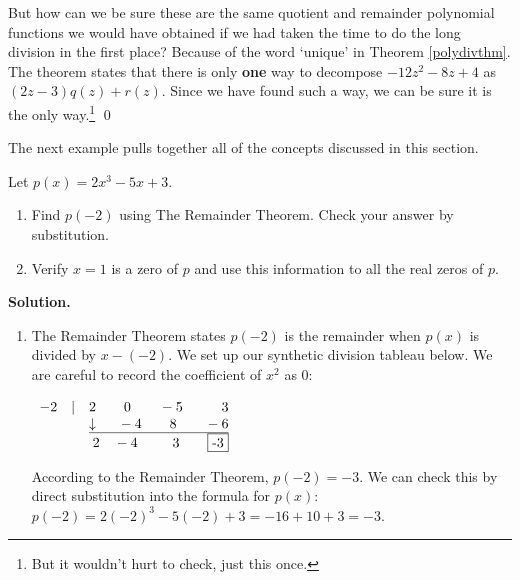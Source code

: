 \documentclass{ximera}
\begin{document}
\begin{example}
\begin{enumerate}
  
 
 But how can we be sure these are the same quotient and remainder polynomial functions we would have obtained if we had taken the time to do the long division in the first place?   Because of the word   `unique' in Theorem \ref{polydivthm}.  The theorem states that there is only \textbf{one} way to decompose $-12z^2-8z+4$ as $(2z-3)q(z) + r(z)$.  Since we have found such a way, we can be sure it is the only way.\footnote{But it wouldn't hurt to check, just this once.} \qed
\end{enumerate}

\end{example}

The next example pulls together all of the concepts discussed in this section.  

\begin{example} Let $p(x) = 2x^3-5x+3$.

\begin{enumerate}

\item  Find $p(-2)$ using The Remainder Theorem.  Check your answer by substitution.

\item  Verify  $x=1$ is a zero of $p$ and use this information to all the real zeros of $p$.

\end{enumerate}

{\bf Solution.}

\begin{enumerate}

\item  The Remainder Theorem states $p(-2)$ is the remainder when $p(x)$ is divided by $x-(-2)$.  We set up our synthetic division tableau below.  We are careful to record the coefficient of $x^2$ as $0$:

\begin{center}
$
\begin{array}{r}
 -2 \quad |\quad 2 \quad\quad 0 \quad\quad -5 \phantom{1.}\quad\quad 3 \\
 \underline{\downarrow \quad\phantom{.}  -4 \quad\quad 8 \quad\quad -6}\\
2 \quad -4 \quad\phantom{111} 3 \phantom{11}\quad \fbox{-3}
\end{array}
$    
\end{center}

According to the Remainder Theorem, $p(-2) = -3$.  We can check this by direct substitution into the formula for $p(x)$:  $p(-2) = 2(-2)^3-5(-2)+3 = -16+10+3=-3$.


\end{enumerate}
\end{example}
\end{document}
